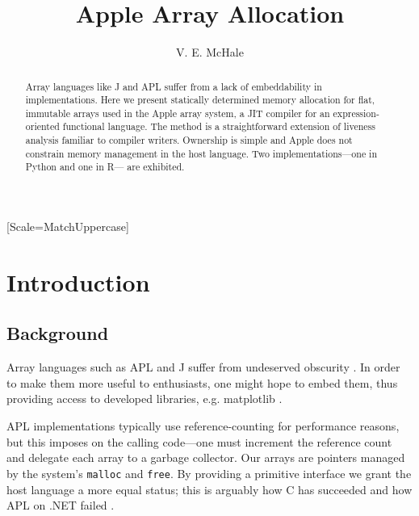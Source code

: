 \documentclass[sigplan,screen,anonymous]{acmart}
\begin{document}
\setmonofont{Jet Brains Mono}[Scale=MatchUppercase]

\begin{abstract}
    Array languages like J and APL suffer from a lack of embeddability in implementations.
    Here we present statically determined memory allocation for flat, immutable arrays used in the Apple array system, a JIT compiler for an expression-oriented functional language.
    The method is a straightforward extension of liveness analysis familiar to compiler writers.
    Ownership is simple and Apple does not constrain memory management in the host language.
    Two implementations---one in Python and one in R--- are exhibited.
\end{abstract}

\title{Apple Array Allocation}
\author{V. E. McHale}
\maketitle

\section{Introduction}

\subsection{Background}

Array languages such as APL and J suffer from undeserved obscurity \cite{hsu2023}. In order to make them more useful to enthusiasts, one might hope to embed them, thus providing access to developed libraries, e.g. matplotlib \cite{hunter2007}.


APL implementations typically use reference-counting \cite[p.~47]{hui2020} for performance reasons, but this imposes on the calling code---one must increment the reference count and delegate each array to a garbage collector. Our arrays are pointers managed by the system's {\tt malloc} and {\tt free}. By providing a primitive interface we grant the host language a more equal status; this is arguably how C has succeeded \cite{kell2017} and how APL on .NET failed \cite[p.~12]{hui2020}.
\end{document}
